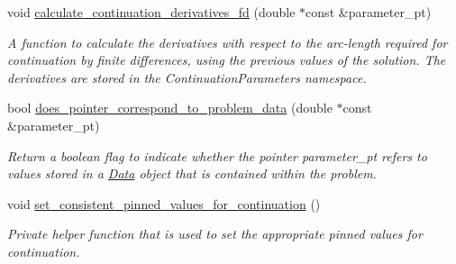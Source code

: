 \begin{DoxyCompactItemize}
void \hyperlink{classoomph_1_1Problem_addc838287129a35ef60e38ea854b939c}{calculate\+\_\+continuation\+\_\+derivatives\+\_\+fd} (double $\ast$const \&parameter\+\_\+pt)
\begin{DoxyCompactList}\small\item\em A function to calculate the derivatives with respect to the arc-\/length required for continuation by finite differences, using the previous values of the solution. The derivatives are stored in the Continuation\+Parameters namespace. \end{DoxyCompactList}\item 
bool \hyperlink{classoomph_1_1Problem_af7a83b109e7662abd52ea552d89163cc}{does\+\_\+pointer\+\_\+correspond\+\_\+to\+\_\+problem\+\_\+data} (double $\ast$const \&parameter\+\_\+pt)
\begin{DoxyCompactList}\small\item\em Return a boolean flag to indicate whether the pointer parameter\+\_\+pt refers to values stored in a \hyperlink{classoomph_1_1Data}{Data} object that is contained within the problem. \end{DoxyCompactList}\item 
void \hyperlink{classoomph_1_1Problem_a9494223b38728ea186a68d6c70b7ebd4}{set\+\_\+consistent\+\_\+pinned\+\_\+values\+\_\+for\+\_\+continuation} ()
\begin{DoxyCompactList}\small\item\em Private helper function that is used to set the appropriate pinned values for continuation. \end{DoxyCompactList}\end{DoxyCompactItemize}

